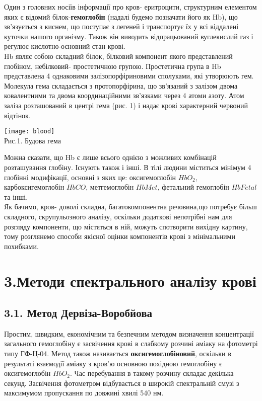 \documentclass[14pt,a4paper]{scrartcl}
\begin{document}
Один з головних носіїв інформації про кров- еритроцити, структурним елементом яких є відомий білок-{\bf гемоглобін} (надалі будемо позначати його як Hb), що зв'язується з киснем, що поступає з легеней і транспортує їх у всі віддалені куточки нашого організму. Також він виводить відпрацьований вуглекислий газ і регулює кислотно-основний стан крові.\\

Hb являє собою складний білок, білковий компонент якого представлений глобіном, небілковий- простетичною групою.\cite{l1} Простетична група в Hb представлена 4 однаковими залізопорфіриновими сполуками, які утворюють гем. Молекула гема складається з протопорфірина, що зв'язаний з залізом двома ковалентними та двома координаційними зв'язками через 4 атоми азоту. Атом заліза розташований в центрі гема (рис. 1) і надає крові характерний червоний відтінок.
\begin{center}
\small
\texttt{[image: blood]}\\[0.3 cm]
Рис.1. Будова гема\cite{l1}
\end{center}
Можна сказати, що Hb є лише всього однією з можливих комбінацій розташування глобіну. Існують також і інші. В тілі людини міститься мінімум 4 глобінні модифікації, основні з яких це:
оксигемоглобін $HbO_2$, карбоксигемоглобін  $HbCO$, метгемоглобін $HbMet$, фетальний гемоглобін $HbFetal$ та інші.\\

Як бачимо, кров- доволі складна, багатокомпонентна речовина,що потребує більш складного, скрупульозного аналізу, оскільки додаткові непотрібні нам для розгляду компоненти, що містяться в ній, можуть спотворити вихідну картину, тому розглянемо способи якісної оцінки компонентів крові з мінімальними похибками.
\newpage
\section*{3.Методи спектрального аналізу крові}
\subsection*{3.1. Метод Дервіза-Воробйова}

Простим, швидким, економічним та безпечним методом визначення концентрації загального гемоглобіну є засвічення крові в слабкому розчині аміаку на фотометрі типу ГФ-Ц-04. Метод також називається {\bf оксигемоглобіновий}, оскільки в результаті взаємодії аміаку з кров'ю основною похідною гемоглобіну є оксигемоглобін $HbO_2$. \cite{l2} Час перебування в такому розчину складає декілька секунд. Засвічення фотометром відбувається в широкій спектральній смузі з максимумом пропускання по довжині хвилі 540 нм.\\
\end{document}

